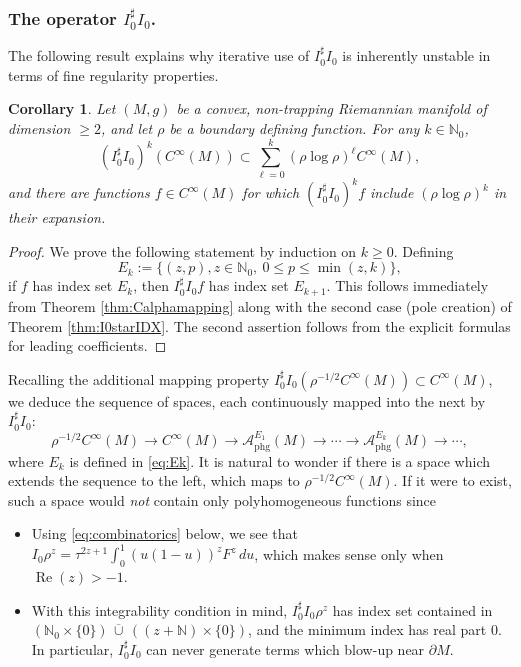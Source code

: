 \documentclass[JEP,XML,SOM,Unicode,NoFloatCountersInSection, NoEqCountersInSection,published]{cedram}
\let\cal\mathcal
\DeclareMathOperator{\Real}{Re}
\theoremstyle{plain}
\newtheorem{Corollary}[Theorem]{Corollary}
\theoremstyle{definition}
\theoremstyle{remark}
\def\Nm{{\mathbb{N}}}
\newcommand{\adj}{I_0^\sharp}
\newcommand{\phg}{\mathrm{phg}}
\begin{document}

\subsubsection*{The operator $\adj I_0$.}
The following result explains why iterative use of $\adj I_0$ is inherently unstable in terms of fine regularity
properties.

\begin{Corollary} Let $(M,g)$ be a convex, non-trapping Riemannian manifold of dimension $\ge 2$, and let $\rho$ be a boundary defining function. For any $k\in \Nm_0$,
\begin{equation*}
(\adj I_0)^k (C^\infty(M)) \subset \sum_{\ell=0}^k (\rho\log \rho)^\ell C^\infty(M),
\end{equation*}
and there are functions $f \in C^\infty(M)$ for which $(\adj I_0)^k f$ include $(\rho\log \rho)^k$ in their expansion.
\end{Corollary}

\begin{proof}
We prove the following statement by induction on $k\ge 0$. Defining
\begin{equation}
E_k := \{ (z,p), z\in \Nm_0,\ 0\le p\le \min (z,k) \},
\label{eq:Ek}
\end{equation}
if $f$ has index set $E_k$, then $\adj I_0 f$ has index set $E_{k+1}$. This follows immediately from Theorem \ref{thm:Calphamapping} along with the second case (pole creation) of Theorem \ref{thm:I0starIDX}. The second assertion follows from the explicit formulas for leading coefficients.
\end{proof}

Recalling the additional mapping property $\adj I_0 (\rho^{-1/2} C^\infty (M))\subset C^\infty(M)$, we deduce the sequence of spaces, each continuously mapped into the next by $\adj I_0$:
\begin{equation}
\rho^{-1/2} C^\infty(M) \to C^\infty(M) \to {\cal A}_{\phg}^{E_1} (M) \to \cdots \to {\cal A}_{\phg}^{E_k} (M) \to \cdots,
\label{eq:seqspaces}
\end{equation}
where $E_k$ is defined in \eqref{eq:Ek}. It is natural to wonder if there is a space which extends the sequence to the left, \ie which maps to $\rho^{-1/2} C^\infty(M)$. If it were to exist, such a space would {\it not} contain only polyhomogeneous functions since
\begin{itemize}
\item Using \eqref{eq:combinatorics} below, we see that $I_0 \rho^z = \tau^{2z+1} \int_0^1 (u(1-u))^z F^z\,du$, which makes sense only when $\Real(z)>-1$.
\item With this integrability condition in mind, $\adj I_0 \rho^z$ has index set contained in $(\Nm_0 \times \{0\})\, \overline{\cup} \, ((z+\Nm)\times \{0\})$, and the minimum index has real part $0$. In particular, $\adj I_0$ can never generate terms which blow-up near $\partial M$.
\end{itemize}
\end{document}
